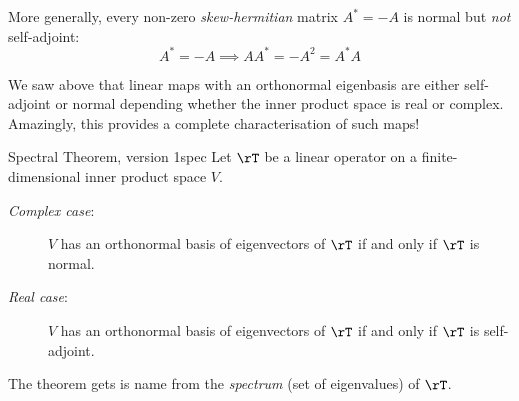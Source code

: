 More generally, every non-zero \emph{skew-hermitian} matrix $A^*=-A$ is normal but \emph{not} self-adjoint:
\[A^*=-A\implies AA^*=-A^2=A^*A\]

We saw above that linear maps with an orthonormal eigenbasis are either self-adjoint or normal depending whether the inner product space is real or complex. Amazingly, this provides a complete characterisation of such maps!


\begin{thm}{Spectral Theorem, version 1}{spec}
Let $\rT$ be a linear operator on a finite-dimensional inner product space $V$.
\begin{description}
  \item[\normalfont\emph{Complex case}:] $V$ has an orthonormal basis of eigenvectors of $\rT$ if and only if $\rT$ is normal.
  \item[\normalfont\emph{Real case}:] $V$ has an orthonormal basis of eigenvectors of $\rT$ if and only if $\rT$ is self-adjoint.
\end{description}
\end{thm}

The theorem gets is name from the \emph{spectrum} (set of eigenvalues) of $\rT$.


\goodbreak

